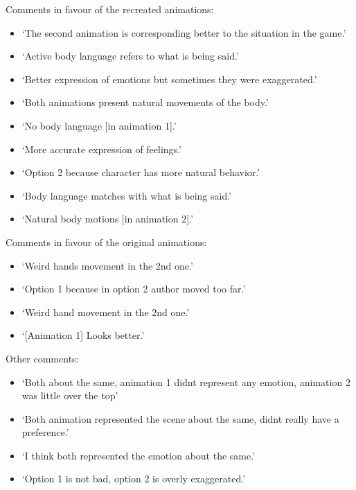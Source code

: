 \noindent Comments in favour of the recreated animations:
\begin{itemize}
	\item `The second animation is corresponding better to the situation in the game.'
	\item `Active body language refers to what is being said.'
	\item `Better expression of emotions but sometimes they were exaggerated.'
	\item `Both animations present natural movements of the body.'
	\item `No body language [in animation 1].'
	\item `More accurate expression of feelings.'
	\item `Option 2 because character has more natural behavior.'
	\item `Body language matches with what is being said.'
	\item `Natural body motions [in animation 2].'
\end{itemize}

\noindent Comments in favour of the original animations:
\begin{itemize}
	\item `Weird hands movement in the 2nd one.'
	\item `Option 1 because in option 2 author moved too far.'
	\item `Weird hand movement in the 2nd one.'
	\item `[Animation 1] Looks better.'
\end{itemize}


\noindent Other comments:
\begin{itemize}
	\item `Both about the same, animation 1 didnt represent any emotion, animation 2 was little over the top'
	\item `Both animation represented the scene about the same, didnt really have a preference.'
	\item `I think both represented the emotion about the same.'
	\item `Option 1 is not bad, option 2 is overly exaggerated.'
\end{itemize}



